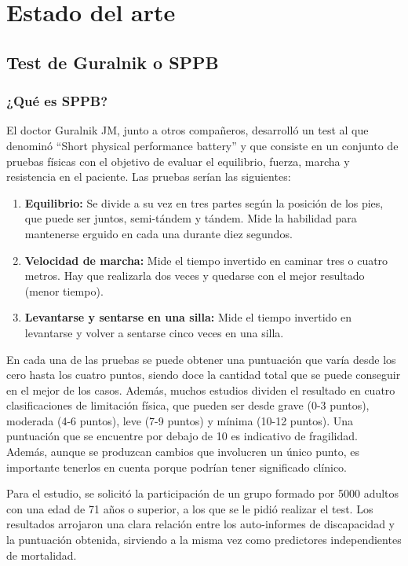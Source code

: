 \chapter{Estado del arte}

\section{Test de Guralnik o SPPB}

\subsection{¿Qué es SPPB?}
El doctor Guralnik JM, junto a otros compañeros, desarrolló un test al que denominó ``Short physical performance battery'' y que consiste en un conjunto de pruebas físicas con el objetivo de evaluar el equilibrio, fuerza, marcha y resistencia en el paciente\cite{SPPB_nlm}. Las pruebas serían las siguientes:

\begin{enumerate}
  \item \textbf{Equilibrio:} Se divide a su vez en tres partes según la posición de los pies, que puede ser juntos, semi-tándem y tándem. Mide la habilidad para mantenerse erguido en cada una durante diez segundos. 
  \item \textbf{Velocidad de marcha:} Mide el tiempo invertido en caminar tres o cuatro metros. Hay que realizarla dos veces y quedarse con el mejor resultado (menor tiempo).
  \item \textbf{Levantarse y sentarse en una silla:} Mide el tiempo invertido en levantarse y volver a sentarse cinco veces en una silla.
\end{enumerate}

En cada una de las pruebas se puede obtener una puntuación que varía desde los cero hasta los cuatro puntos, siendo doce la cantidad total que se puede conseguir en el mejor de los casos. Además, muchos estudios dividen el resultado en cuatro clasificaciones de limitación física, que pueden ser desde grave (0-3 puntos), moderada (4-6 puntos), leve (7-9 puntos) y mínima (10-12 puntos)\cite[Pag 8]{SPPB_clasificacion}. Una puntuación que se encuentre por debajo de 10 es indicativo de fragilidad. Además, aunque se produzcan cambios que involucren un único punto, es importante tenerlos en cuenta porque podrían tener significado clínico\cite{juntandalucia}.

Para el estudio, se solicitó la participación de un grupo formado por 5000 adultos con una edad de 71 años o superior, a los que se le pidió realizar el test. Los resultados arrojaron una clara relación entre los auto-informes de discapacidad y la puntuación obtenida, sirviendo a la misma vez como predictores independientes de mortalidad. \cite{SPPB_nlm}

